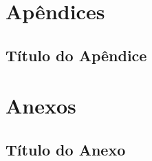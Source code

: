 \documentclass[11pt,oneside,a4paper,english,french,spanish,brazil]{abntex2}
\begin{document}
            \clearpage
            


            \part*{Apêndices}
            \begin{apendicesenv}

                \chapter{Título do Apêndice}\label{apend:apendice1}
                

            \end{apendicesenv}

             \part*{Anexos}
             \begin{anexosenv}

                \chapter{Título do Anexo}\label{anex:anexo1}
                

             \end{anexosenv}

            \printindex

\end{document}
